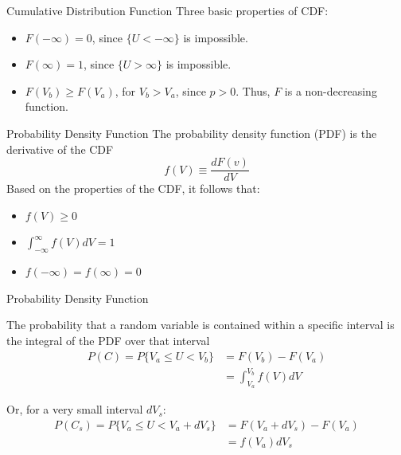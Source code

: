
\begin{frame}{Cumulative Distribution Function}
Three basic properties of CDF:
\begin{itemize}
  	\item $F(-\infty) = 0$, since $\{U < -\infty\}$ is impossible.
  	\item $F(\infty) = 1$, since $\{U > \infty\}$ is impossible.
  	\item $F(V_b) \geq F(V_a)$, for $V_b > V_a$, since $p > 0$. Thus, $F$ is a non-decreasing function.  
  \end{itemize}
\end{frame}


\begin{frame}{Probability Density Function}
The probability density function (PDF) is the derivative of the CDF
$$f(V)\equiv \frac{d F(v)}{dV}$$
Based on the properties of the CDF, it follows that:
\begin{itemize}
  	\item $f(V) \geq 0$
  	\item $\int^{\infty}_{-\infty} f(V) dV = 1$
  	\item $f(-\infty) = f(\infty) = 0$
  \end{itemize}
\end{frame}


\begin{frame}{Probability Density Function}

The probability that a random variable is contained within a specific interval is the integral of the PDF over that interval 
\begin{align*}
P(C) = P\{V_a \leq U < V_b \} &= F(V_b) - F(V_a)\\
&= \int^{V_b}_{V_a} f(V) dV
\end{align*}

Or, for a very small interval $dV_s$:
\begin{align*}
P(C_s) = P\{V_a \leq U < V_a + dV_s \} &= F(V_a + dV_s) - F(V_a)\\
&= f(V_a)dV_s
\end{align*}

\end{frame}


